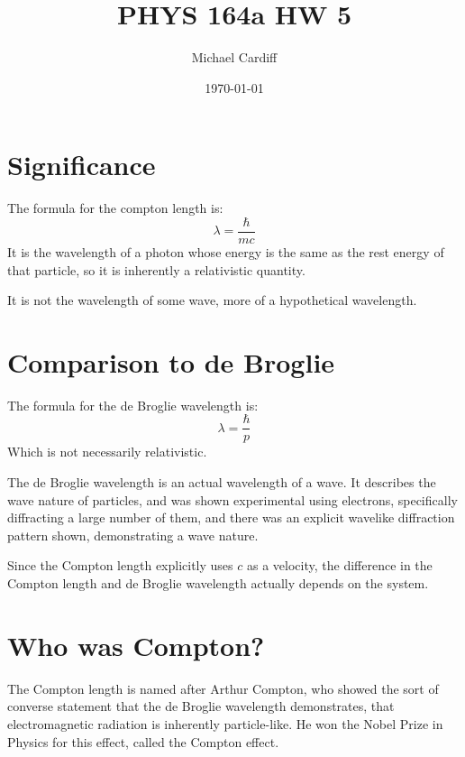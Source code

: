 \documentclass[12pt]{article}
\title{\vspace{-3em}PHYS 164a HW 5}
\author{Michael Cardiff}
\date{\today}
\begin{document}
\maketitle

\section{Significance}
The formula for the compton length is:
\begin{equation}
  \lambda= \frac{\hbar}{mc}
\end{equation}
It is the wavelength of a photon whose energy is the same as the rest energy of that particle, so it is inherently a relativistic quantity.

It is not the wavelength of some wave, more of a hypothetical wavelength.
\section{Comparison to de Broglie}
The formula for the de Broglie wavelength is:
\begin{equation}
  \lambda=\frac{\hbar}{p}
\end{equation}
Which is not necessarily relativistic.

The de Broglie wavelength is an actual wavelength of a wave. It describes the wave nature of particles, and was shown experimental using electrons, specifically diffracting a large number of them, and there was an explicit wavelike diffraction pattern shown, demonstrating a wave nature.

Since the Compton length explicitly uses $c$ as a velocity, the difference in the Compton length and de Broglie wavelength actually depends on the system.
\section{Who was Compton?}
The Compton length is named after Arthur Compton, who showed the sort of converse statement that the de Broglie wavelength demonstrates, that electromagnetic radiation is inherently particle-like. He won the Nobel Prize in Physics for this effect, called the Compton effect. 
\end{document}
